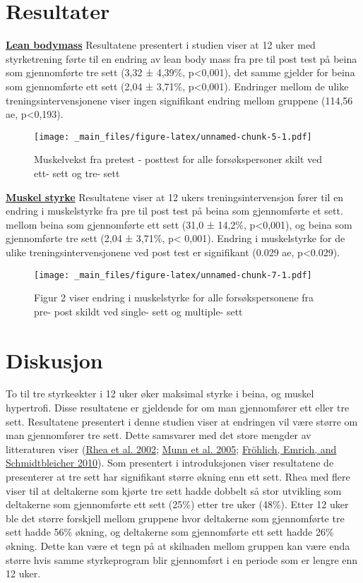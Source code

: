 \documentclass[
]{book}
\begin{document}
\hypertarget{resultater-1}{%
\section{Resultater}\label{resultater-1}}

\underline{\textbf{Lean bodymass}} Resultatene presentert i studien
viser at 12 uker med styrketrening førte til en endring av lean body
mass fra pre til post test på beina som gjennomførte tre sett (3,32 ±
4,39\%, p\textless0,001), det samme gjelder for beina som gjennomførte
ett sett (2,04 ± 3,71\%, p\textless0,001). Endringer mellom de ulike
treningsintervensjonene viser ingen signifikant endring mellom gruppene
(114,56 ae, p\textless0,193).

\begin{figure}
\centering
\texttt{[image: \_main\_files/figure-latex/unnamed-chunk-5-1.pdf]}
\caption{Muskelvekst fra pretest - posttest for alle forsøkspersoner
skilt ved ett- sett og tre- sett}
\end{figure}

\underline{\textbf{Muskel styrke}} Resultatene viser at 12 ukers
treningsintervensjon fører til en endring i muskelstyrke fra pre til
post test på beina som gjennomførte et sett. mellom beina som
gjennomførte ett sett (31,0 ± 14,2\%, p\textless0,001), og beina som
gjennomførte tre sett (2,04 ± 3,71\%, p\textless{} 0,001). Endring i
muskelstyrke for de ulike treningsintervensjonene ved post test er
signifikant (0.029 ae, p\textless0.029).

\begin{figure}
\centering
\texttt{[image: \_main\_files/figure-latex/unnamed-chunk-7-1.pdf]}
\caption{Figur 2 viser endring i muskelstyrke for alle forsøkspersonene
fra pre- post skildt ved single- sett og multiple- sett}
\end{figure}

\hypertarget{diskusjon-1}{%
\section{Diskusjon}\label{diskusjon-1}}

To til tre styrkeøkter i 12 uker øker maksimal styrke i beina, og muskel
hypertrofi. Disse resultatene er gjeldende for om man gjennomfører ett
eller tre sett. Resultatene presentert i denne studien viser at
endringen vil være større om man gjennomfører tre sett. Dette samsvarer
med det store mengder av litteraturen viser
(\protect\hyperlink{ref-rhea2002}{Rhea et al. 2002};
\protect\hyperlink{ref-munn2005}{Munn et al. 2005};
\protect\hyperlink{ref-fruxf6hlich2010}{Fröhlich, Emrich, and
Schmidtbleicher 2010}). Som presentert i introduksjonen viser
resultatene de presenterer at tre sett har signifikant større økning enn
ett sett. Rhea med flere viser til at deltakerne som kjørte tre sett
hadde dobbelt så stor utvikling som deltakerne som gjennomførte ett sett
(25\%) etter tre uker (48\%). Etter 12 uker ble det større forskjell
mellom gruppene hvor deltakerne som gjennomførte tre sett hadde 56\%
økning, og deltakerne som gjennomførte ett sett hadde 26\% økning. Dette
kan være et tegn på at skilnaden mellom gruppen kan være enda større
hvis samme styrkeprogram blir gjennomført i en periode som er lengre enn
12 uker.
\end{document}
